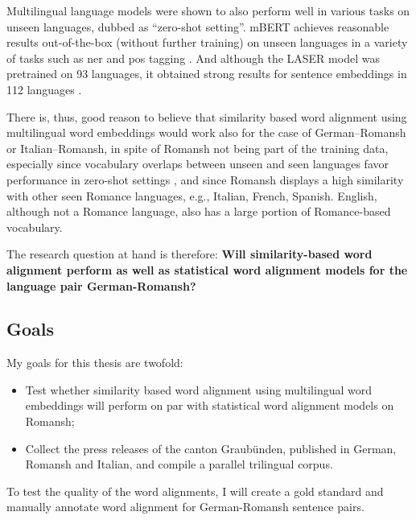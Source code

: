 Multilingual language models were shown to also perform  well in various tasks on unseen languages, dubbed as \enquote{zero-shot setting}. 
mBERT achieves reasonable results out-of-the-box (without further training) on unseen languages in a variety of tasks such as \acrfull{ner} and \acrfull{pos} tagging \autocite{pires-etal-2019-multilingual}.
And although the LASER model was pretrained on 93 languages, it obtained strong results for sentence embeddings in 112 languages \autocite{artexte-schwenk-2019-laser}. 

There is, thus, good reason to believe that similarity based word alignment using multilingual word embeddings would work also for the case of German--Romansh or Italian--Romansh, in spite of Romansh not being part of the training data, especially since vocabulary overlaps between unseen and seen languages favor performance in zero-shot settings \autocite{pires-etal-2019-multilingual}, and since Romansh displays a high similarity with other seen Romance languages, e.g., Italian, French, Spanish. 
English, although not a Romance language, also has a large portion of Romance-based vocabulary.

The research question at hand is therefore: \textbf{Will similarity-based word alignment perform as well as statistical word alignment models for the language pair German-Romansh?}



\subsection{Goals}
My goals for this thesis are twofold:
\begin{itemize}
	\item Test whether similarity based word alignment using multilingual word embeddings will perform on par with statistical word alignment models on Romansh;

	\item Collect the press releases of the canton Graubünden, published in German, Romansh and Italian, and compile a parallel trilingual corpus. 

\end{itemize}
To test the quality of the word alignments, I will create a gold standard and manually annotate word alignment for German-Romansh sentence pairs.

